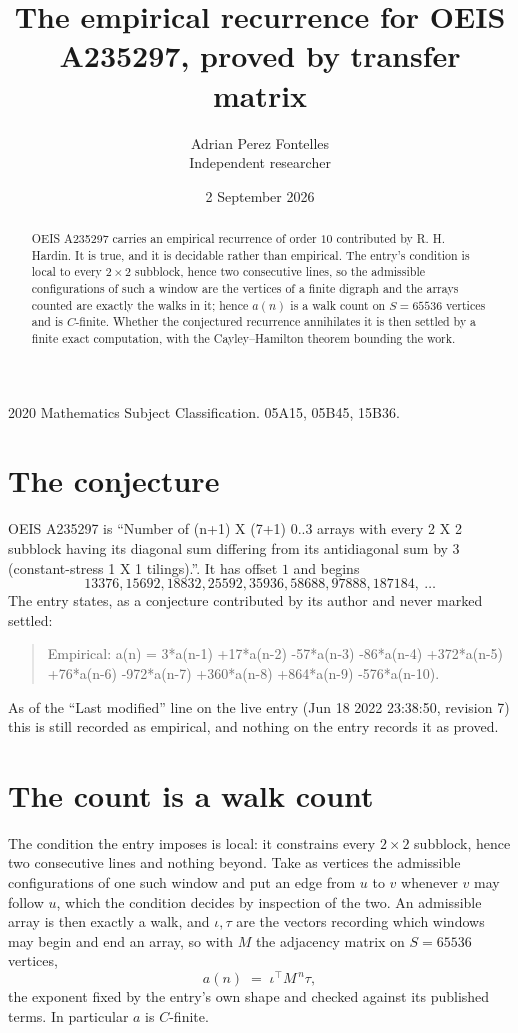 \documentclass[11pt,a4paper]{article}
\title{The empirical recurrence for OEIS A235297, proved by transfer matrix}
\author{Adrian Perez Fontelles\\ \small Independent researcher}
\date{2 September 2026}
\theoremstyle{plain}
\theoremstyle{definition}
\begin{document}
\maketitle

\begin{abstract}
OEIS A235297 carries an empirical recurrence of order $10$ contributed by R. H. Hardin. It is
true, and it is decidable rather than empirical. The entry's condition is local to every $2\times2$ subblock, hence two consecutive lines, so
the admissible configurations of such a window are the vertices of a finite digraph and the
arrays counted are exactly the walks in it; hence $a(n)$ is a walk count on $S=65536$ vertices
and is $C$-finite. Whether the conjectured recurrence annihilates it is then settled by a
finite exact computation, with the Cayley--Hamilton theorem bounding the work.
\end{abstract}

\noindent\small 2020 Mathematics Subject Classification. 05A15, 05B45, 15B36.\normalsize

\section{The conjecture}

OEIS A235297 is ``Number of (n+1) X (7+1) 0..3 arrays with every 2 X 2 subblock having its diagonal sum differing from its antidiagonal sum by 3 (constant-stress 1 X 1 tilings).''. It has offset $1$ and begins
\[
13376, 15692, 18832, 25592, 35936, 58688, 97888, 187184,\ \dots
\]
The entry states, as a conjecture contributed by its author and never marked settled:
\begin{quote}
Empirical: a(n) = 3*a(n-1) +17*a(n-2) -57*a(n-3) -86*a(n-4) +372*a(n-5) +76*a(n-6) -972*a(n-7) +360*a(n-8) +864*a(n-9) -576*a(n-10).
\end{quote}
As of the ``Last modified'' line on the live entry (Jun 18 2022 23:38:50, revision 7) this is still
recorded as empirical, and nothing on the entry records it as proved.

\section{The count is a walk count}

The condition the entry imposes is local: it constrains every $2\times2$ subblock, hence two consecutive lines and nothing beyond. Take as vertices the admissible configurations of one such window and put an edge from $u$ to $v$ whenever $v$ may follow $u$, which the condition decides by inspection of the two.
An admissible array is then exactly a walk, and $\iota,\tau$ are the vectors recording which windows may begin and end an array, so with $M$ the adjacency matrix on $S=65536$ vertices,
\[
a(n)\;=\;\iota^{\!\top}M^{\,n}\tau ,
\]
the exponent fixed by the entry's own shape and checked against its published terms. In
particular $a$ is $C$-finite.
\end{document}

